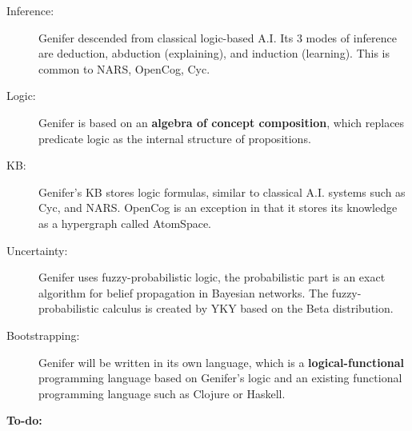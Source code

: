 \documentclass[12pt, a4paper]{report}
\theoremstyle{examples} \newtheorem{example}{Example}[section]
\begin{document}
\vspace{1em}
\begin{description}

\item[Inference:] Genifer descended from classical logic-based A.I.  Its 3 modes of inference are deduction, abduction (explaining), and induction (learning).  This is common to NARS, OpenCog, Cyc.

\item[Logic:] Genifer is based on an \textbf{algebra of concept composition}, which replaces predicate logic as the internal structure of propositions.

\item[KB:] Genifer's KB stores logic formulas, similar to classical A.I. systems such as Cyc, and NARS.  OpenCog is an exception in that it stores its knowledge as a hypergraph called AtomSpace.

\item[Uncertainty:] Genifer uses fuzzy-probabilistic logic, the probabilistic part is an exact algorithm for belief propagation in Bayesian networks.  The fuzzy-probabilistic calculus is created by YKY based on the Beta distribution.

\item[Bootstrapping:] Genifer will be written in its own language, which is a \textbf{logical-functional} programming language based on Genifer's logic and an existing functional programming language such as Clojure or Haskell.

\end{description}

\vspace{2em}

\color{TodoColor}

{\sffamily\bfseries\Huge To-do:}
\end{document}
